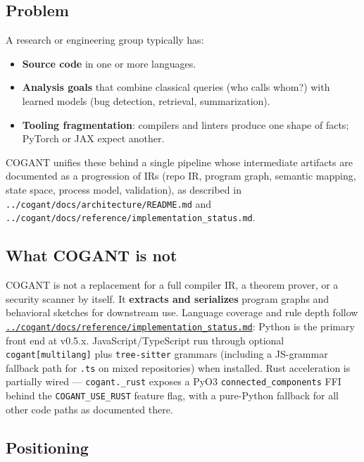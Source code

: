 \documentclass[
]{article}
\providecommand{\tightlist}{%
  \setlength{\itemsep}{0pt}\setlength{\parskip}{0pt}}
\begin{document}
\subsection{Problem}\label{problem}

A research or engineering group typically has:

\begin{itemize}
\tightlist
\item
  \textbf{Source code} in one or more languages.
\item
  \textbf{Analysis goals} that combine classical queries (who calls
  whom?) with learned models (bug detection, retrieval, summarization).
\item
  \textbf{Tooling fragmentation}: compilers and linters produce one
  shape of facts; PyTorch or JAX expect another.
\end{itemize}

COGANT unifies these behind a single pipeline whose intermediate
artifacts are documented as a progression of IRs (repo IR, program
graph, semantic mapping, state space, process model, validation), as
described in \texttt{../cogant/docs/architecture/README.md} and
\texttt{../cogant/docs/reference/implementation\_status.md}.

\subsection{What COGANT is not}\label{what-cogant-is-not}

COGANT is not a replacement for a full compiler IR, a theorem prover, or
a security scanner by itself. It \textbf{extracts and serializes}
program graphs and behavioral sketches for downstream use. Language
coverage and rule depth follow
\href{../cogant/docs/reference/implementation_status.md}{\texttt{../cogant/docs/reference/implementation\_status.md}}:
Python is the primary front end at v0.5.x. JavaScript/TypeScript run
through optional \texttt{cogant{[}multilang{]}} plus
\texttt{tree-sitter} grammars (including a JS-grammar fallback path for
\texttt{.ts} on mixed repositories) when installed. Rust acceleration is
partially wired --- \texttt{cogant.\_rust} exposes a PyO3
\texttt{connected\_components} FFI behind the \texttt{COGANT\_USE\_RUST}
feature flag, with a pure-Python fallback for all other code paths as
documented there.

\subsection{Positioning}\label{positioning}
\end{document}
